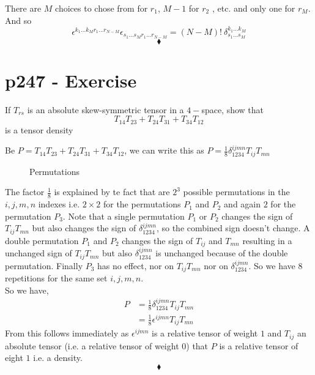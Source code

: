 There are $M$ choices to chose from for $r_1$, $M-1$ for $r_2$ , etc. and only one for $r_M$. And so $$\epsilon^{k_1\dots k_M r_1\dots r_{N-M}}\epsilon_{s_1\dots s_M r_1\dots r_{N-M}}= \left(N-M\right)!\ \delta^{k_1\dots k_M}_{s_1\dots s_M}$$
$$\blacklozenge$$
\newpage




\section{p247 - Exercise }
\begin{tcolorbox}
If $T_{rs}$  is an absolute skew-symmetric tensor in a $4-$space, show that $$T_{14}T_{23}+T_{24}T_{31}+T_{34}T_{12}$$ is a tensor density
\end{tcolorbox}
Be $P= T_{14}T_{23}+T_{24}T_{31}+T_{34}T_{12}$, we can write this as $P= \frac{1}{8}\delta^{ijmn}_{1234}T_{ij}T_{mn}$ 
\begin{figure}[H]%
    \centering
    \subfloat[]{}
\caption{Permutations}
\label{fig:fig_p247}
\end{figure}
The factor $\frac{1}{8}$ is explained by te fact that are $2^3$ possible permutations in the $i,j,m,n$ indexes i.e. $2\times2$ for the permutations $P_1$ and $P_2$ and again $2$ for the permutation $P_3$. Note that a single permutation $P_1$ or $P_2$ changes the sign of  $T_{ij}T_{mn}$ but also changes the sign of $\delta^{ijmn}_{1234}$, so the combined sign doesn't change. A double permutation $P_1$ and  $P_2$ changes the sign of  $T_{ij}$ and $T_{mn}$ resulting in a unchanged sign of  $T_{ij}T_{mn}$ but also $\delta^{ijmn}_{1234}$ is unchanged because of the double permutation. Finally $P_3$ has no effect, nor on $T_{ij}T_{mn}$ nor on $\delta^{ijmn}_{1234}$. So we have 8 repetitions for  the same set $i,j,m,n$.\\
So we have, 
\begin{align*}
P&= \frac{1}{8}\delta^{ijmn}_{1234}T_{ij}T_{mn}\\
&= \frac{1}{8}\epsilon^{ijmn}T_{ij}T_{mn}
\end{align*}
From this follows immediately as $\epsilon^{ijmn}$ is a relative tensor of weight $1$ and $T_{ij}$ an absolute tensor (i.e. a relative tensor of weight $0$) that $P$ is a relative tensor of eight $1$ i.e. a density.
$$\blacklozenge$$
\newpage



